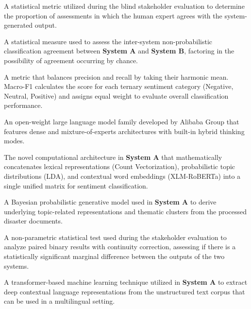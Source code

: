 \documentclass[12pt,a4paper]{report}
\newcommand{\sysA}{\textbf{System A}}
\newcommand{\sysB}{\textbf{System B}}
\newcommand{\xlmr}{XLM-RoBERTa}
\begin{document}
\begin{description}[style=nextline,leftmargin=0pt]
  \item[Agreement Rate.] A statistical metric utilized during the blind
  stakeholder evaluation to determine the proportion of assessments in which
  the human expert agrees with the system-generated output.

  \item[Cohen's Kappa ($\kappa$).] A statistical measure used to assess the
  inter-system non-probabilistic classification agreement between \sysA{} and
  \sysB, factoring in the possibility of agreement occurring by chance.

  \item[F1-Score / Macro-F1.] A metric that balances precision and recall by
  taking their harmonic mean. Macro-F1 calculates the score for each ternary
  sentiment category (Negative, Neutral, Positive) and assigns equal weight to
  evaluate overall classification performance.

  \item[Qwen3.] An open-weight large language model family developed by
  Alibaba Group that features dense and mixture-of-experts architectures with
  built-in hybrid thinking modes.

  \item[Joint Matrix.] The novel computational architecture in \sysA{} that
  mathematically concatenates lexical representations (Count Vectorization),
  probabilistic topic distributions (LDA), and contextual word embeddings
  (\xlmr) into a single unified matrix for sentiment classification.

  \item[Latent Dirichlet Allocation (LDA).] A Bayesian probabilistic
  generative model used in \sysA{} to derive underlying topic-related
  representations and thematic clusters from the processed disaster documents.

  \item[McNemar's Test.] A non-parametric statistical test used during the
  stakeholder evaluation to analyze paired binary results with continuity
  correction, assessing if there is a statistically significant marginal
  difference between the outputs of the two systems.

  \item[XLM-RoBERTa (Robustly Optimized BERT Pretraining Approach).] A
  transformer-based machine learning technique utilized in \sysA{} to extract
  deep contextual language representations from the unstructured text corpus
  that can be used in a multilingual setting.


\end{description}
\end{document}
